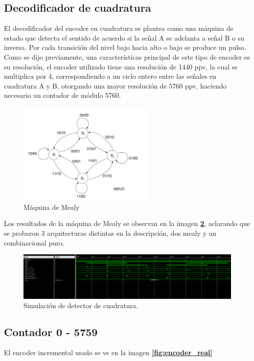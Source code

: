 \documentclass[11pt, a4paper]{article}
\begin{document}
		
		\subsection{Decodificador de cuadratura}
			El decodificador del encoder en cuadratura se plantea como una máquina de estado que detecta el sentido de acuerdo si la señal A se adelanta a señal B o su inversa. Por cada transición del nivel bajo hacia alto o bajo se produce un pulso. Como se dijo previamente, una características principal de este tipo de encoder es su resolución, el encoder utilizado tiene una resolución de 1440 ppv, la cual se multiplica por 4, correspondiendo a un ciclo entero entre las señales en cuadratura A y B, otorgando una mayor resolución de 5760 ppv, haciendo necesario un contador de módulo 5760.
		\begin{figure}[H]
			\centering
			\includegraphics[width=0.6\textwidth]{Imagenes/mealy.jpg}
			\caption{Máquina de Mealy}
			\label{fig:mealy}
		\end{figure} 
		
		Los resultados de la máquina de Mealy se observan en la imagen \textcolor{blue}{\textbf{\ref{fig:mealy_tb}}}, aclarando que se probaron 3 arquitecturas distintas en la descripción, dos mealy y un combinacional puro.

		\begin{figure}[H]
			\centering
			\includegraphics[width=\textwidth]{Imagenes/tb_mealy.png}
			\caption{Simulación de detector de cuadratura.}
			\label{fig:mealy_tb}
		\end{figure} 
\clearpage

		\subsection{Contador 0 - 5759}
			El encoder incremental usado se ve en la imagen \textcolor{blue}{\textbf{\ref{fig:encoder_real}}} 
\end{document}

